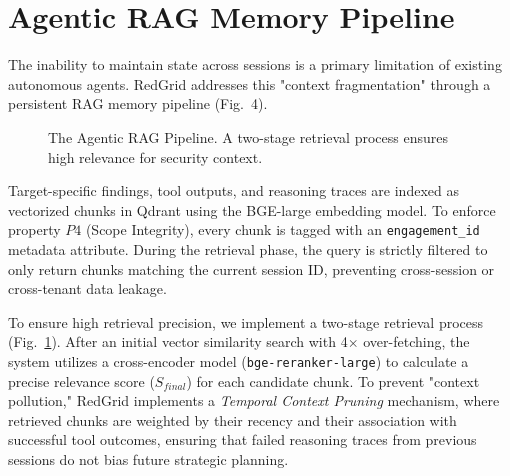 \documentclass[conference,compsoc]{IEEEtran}
\begin{document}
\section{Agentic RAG Memory Pipeline} \label{sec:memory}
The inability to maintain state across sessions is a primary limitation of existing autonomous agents. RedGrid addresses this "context fragmentation" through a persistent RAG memory pipeline (Fig.~4). 

\begin{figure}[htbp]
\centering
{}
\caption{The Agentic RAG Pipeline. A two-stage retrieval process ensures high relevance for security context.}
\label{fig:rag}
\end{figure}

Target-specific findings, tool outputs, and reasoning traces are indexed as vectorized chunks in Qdrant using the BGE-large embedding model. To enforce property $P4$ (Scope Integrity), every chunk is tagged with an \texttt{engagement\_id} metadata attribute. During the retrieval phase, the query is strictly filtered to only return chunks matching the current session ID, preventing cross-session or cross-tenant data leakage.

To ensure high retrieval precision, we implement a two-stage retrieval process (Fig.~\ref{fig:rag}). After an initial vector similarity search with 4$\times$ over-fetching, the system utilizes a cross-encoder model (\texttt{bge-reranker-large}) to calculate a precise relevance score ($S_{final}$) for each candidate chunk. To prevent "context pollution," RedGrid implements a \textit{Temporal Context Pruning} mechanism, where retrieved chunks are weighted by their recency and their association with successful tool outcomes, ensuring that failed reasoning traces from previous sessions do not bias future strategic planning.
\end{document}
